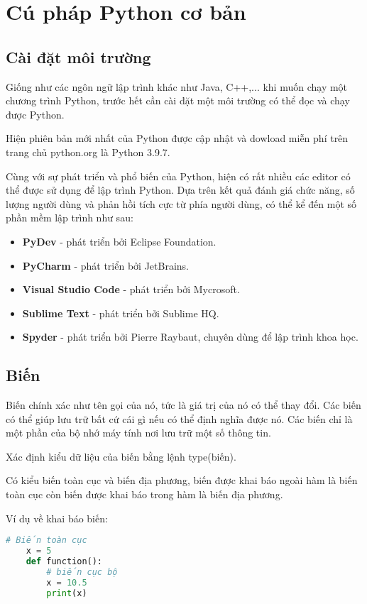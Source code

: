 \documentclass[../main-report.tex]{subfiles}
\begin{document}
\section{Cú pháp Python cơ bản}
\subsection{Cài đặt môi trường}

Giống như các ngôn ngữ lập trình khác như Java, C++,... khi muốn chạy một
chương trình Python, trước hết cần cài đặt một môi trường có thể đọc và chạy
được Python.

Hiện phiên bản mới nhất của Python được cập nhật và dowload miễn phí trên
trang chủ python.org là Python 3.9.7.

Cùng với sự phát triển và phổ biến của Python, hiện có rất nhiều các editor có
thể được sử dụng để lập trình Python. Dựa trên kết quả đánh giá chức năng, số
lượng người dùng và phản hồi tích cực từ phía người dùng, có thể kể đến một số
phần mềm lập trình như sau:

\begin{itemize}
    \item \textbf{PyDev} - phát triển bởi Eclipse Foundation.
    \item \textbf{PyCharm} - phát triển bởi JetBrains.
    \item \textbf{Visual Studio Code} - phát triển bởi Mycrosoft.
    \item \textbf{Sublime Text} - phát triển bởi Sublime HQ.
    \item \textbf{Spyder} - phát triển bởi Pierre Raybaut, chuyên dùng để lập trình khoa học.
\end{itemize}

\subsection{Biến}
Biến chính xác như tên gọi của nó, tức là giá trị của nó có thể thay đổi. Các 
biến có thể giúp lưu trữ bất cứ cái gì nếu có thể định nghĩa được nó. Các biến chỉ là 
một phần của bộ nhớ máy tính nơi lưu trữ một số thông tin. 

Xác định kiểu dữ liệu của biến bằng lệnh type(biến).

Có kiểu biến toàn cục và biến địa phương, biến được khai báo ngoài hàm là biến
toàn cục còn biến được khai báo trong hàm là biến địa phương.

\begin{example}
Ví dụ về khai báo biến:

\begin{lstlisting}[language=Python]
    # Biến toàn cục
    x = 5
    def function():
        # biến cục bộ
        x = 10.5
        print(x)
\end{lstlisting}
\end{example}
\end{document}
